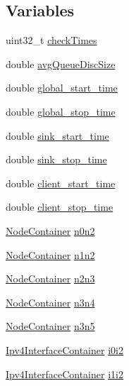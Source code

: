 \subsection*{Variables}
\begin{DoxyCompactItemize}
\item 
uint32\+\_\+t \hyperlink{adaptive-red-tests_8cc_aeea215f1e5c3568bca85c126b9870c09}{check\+Times}
\item 
double \hyperlink{adaptive-red-tests_8cc_a7058a9ca1256be97bd01c637ff170dc2}{avg\+Queue\+Disc\+Size}
\item 
double \hyperlink{adaptive-red-tests_8cc_ab3a0ca969f11332a6b4ca8bc81e19ba7}{global\+\_\+start\+\_\+time}
\item 
double \hyperlink{adaptive-red-tests_8cc_a374328526043935f11841a7ec7e396d5}{global\+\_\+stop\+\_\+time}
\item 
double \hyperlink{adaptive-red-tests_8cc_a2c56dc9b543a4442a7edd8d680c4a1bc}{sink\+\_\+start\+\_\+time}
\item 
double \hyperlink{adaptive-red-tests_8cc_a2462eef540f5b896f14d4ea7b7bb6214}{sink\+\_\+stop\+\_\+time}
\item 
double \hyperlink{adaptive-red-tests_8cc_a18ff86acaf663200fbedb1f77d03b515}{client\+\_\+start\+\_\+time}
\item 
double \hyperlink{adaptive-red-tests_8cc_aee714f5dcf74da2f73bcdd66c8a9e265}{client\+\_\+stop\+\_\+time}
\item 
\hyperlink{classns3_1_1NodeContainer}{Node\+Container} \hyperlink{adaptive-red-tests_8cc_aeaa87dbd052b50719525adea0f586b36}{n0n2}
\item 
\hyperlink{classns3_1_1NodeContainer}{Node\+Container} \hyperlink{adaptive-red-tests_8cc_a68f69f65725cbe7529e8b594708b8fc0}{n1n2}
\item 
\hyperlink{classns3_1_1NodeContainer}{Node\+Container} \hyperlink{adaptive-red-tests_8cc_a4bc708159d3ec761080f4639c1c8f409}{n2n3}
\item 
\hyperlink{classns3_1_1NodeContainer}{Node\+Container} \hyperlink{adaptive-red-tests_8cc_a71269c713841141f40860e991d435588}{n3n4}
\item 
\hyperlink{classns3_1_1NodeContainer}{Node\+Container} \hyperlink{adaptive-red-tests_8cc_af4c498a2bfb720685107e00e03067e31}{n3n5}
\item 
\hyperlink{classns3_1_1Ipv4InterfaceContainer}{Ipv4\+Interface\+Container} \hyperlink{adaptive-red-tests_8cc_a04048bb862423a1ed10deed33021fe0c}{i0i2}
\item 
\hyperlink{classns3_1_1Ipv4InterfaceContainer}{Ipv4\+Interface\+Container} \hyperlink{adaptive-red-tests_8cc_abe23af3b1cb569ee9ee4ed7370791041}{i1i2}

\end{DoxyCompactItemize}

